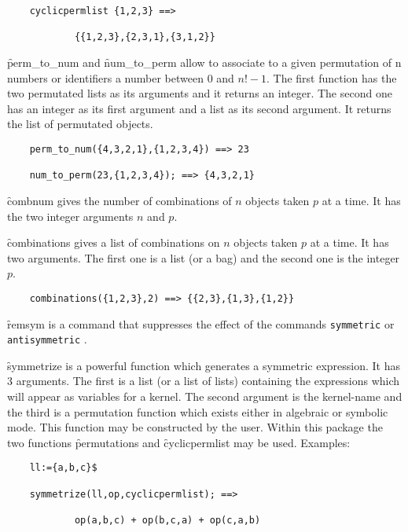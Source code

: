 \begin{itemize}
\begin{verbatim}
    cyclicpermlist {1,2,3} ==>

            {{1,2,3},{2,3,1},{3,1,2}}
\end{verbatim}
\hypertarget{operator:PERM_TO_NUM}{}
\hypertarget{operator:NUM_TO_PERM}{}
\f{perm\_to\_num} and \f{num\_to\_perm} allow to associate to a given 
permutation of n numbers or identifiers a number between $0$ and 
$n! - 1$. The first function has the two permutated lists  
as its arguments and it returns an integer. The second one has an integer  
as its first argument and a list as its second argument. It returns the 
list of permutated objects.
\begin{verbatim}
    perm_to_num({4,3,2,1},{1,2,3,4}) ==> 23

    num_to_perm(23,{1,2,3,4}); ==> {4,3,2,1}
\end{verbatim}
\hypertarget{operator:COMBNUM}{}
\f{combnum} gives the number of combinations of $n$ objects
taken $p$ at a time. It has the two integer arguments $n$ and $p$.

\hypertarget{operator:COMBINATIONS}{}
\f{combinations} gives a list of combinations on $n$ objects taken $p$
at a time. It has two arguments. The first one is a list (or a bag) and
the second one is the integer $p$.
\begin{verbatim}
    combinations({1,2,3},2) ==> {{2,3},{1,3},{1,2}}
\end{verbatim}
\f{remsym} is a command that suppresses the effect of the \REDUCE commands
\texttt{symmetric} or \texttt{antisymmetric} .

\hypertarget{operator:SYMMETRIZE}{}
\f{symmetrize} is a powerful function which generates a symmetric expression.
It has 3 arguments. The first is a list (or a list of lists) containing
the expressions which will appear as variables for a kernel. The second
argument is the kernel-name and the third is a permutation function
which exists either in algebraic or symbolic mode. This
function may be constructed by the user. Within this package
the two functions \f{permutations} and \f{cyclicpermlist} may be used.
Examples:
\begin{verbatim}
    ll:={a,b,c}$

    symmetrize(ll,op,cyclicpermlist); ==>

            op(a,b,c) + op(b,c,a) + op(c,a,b)


\end{verbatim}
\end{itemize}
